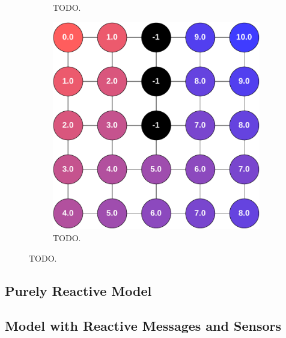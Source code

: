 \begin{figure}
\begin{subfigure}[b]{.49\textwidth}
        \caption{TODO.}
        \label{fig:gradient-envronment}
    \end{subfigure}
    \hfill
    \begin{subfigure}[b]{.49\textwidth}
        \centering
        \includegraphics[width=\textwidth]{figures/gradient-environment-execution.pdf}
        \caption{TODO.}
        \label{fig:gradient-envronment-execution}
    \end{subfigure}
\end{figure}



\subsection{Purely Reactive Model}



\subsection{Model with Reactive Messages and Sensors}


